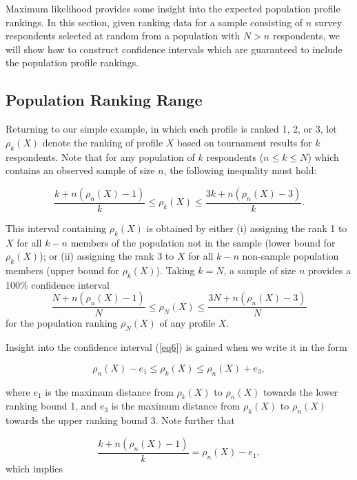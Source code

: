 \documentclass[a4paper, 12pt]{article}
\begin{document}
Maximum likelihood  provides some insight into the expected population profile rankings. In this section, given ranking data for a sample consisting of $n$ survey respondents selected at random from a population with $N> n$ respondents, we will show how to construct confidence  intervals   which are guaranteed to include the population profile rankings.

\subsection{Population Ranking Range}

Returning to our simple example, in which each profile is ranked 1, 2, or 3, let $\rho_k(X)$ denote the ranking of profile $X$ based on tournament results for $k$ respondents. Note that for any population of $k$ respondents ($n\le k \le N$) which contains an observed sample of size $n$, the following inequality must hold:

\begin{equation}
\frac{k+n(\rho_n(X)-1)}{k}\le \rho_k(X)  \le \frac{3k+n(\rho_n(X)-3)}{k}.
\label{eq6}
\end{equation}

{\flushleft This} interval containing $\rho_k(X) $ is obtained by either (i) assigning the  rank 1 to $X$ for all $k-n$ members of the population not in the sample (lower bound for $\rho_k(X)$); or (ii) assigning the rank 3 to $X$  for all $k-n$ non-sample population members (upper bound for $\rho_k(X)$). Taking $k=N$, a sample of size $n$ provides  a 100\% confidence interval $$\frac{N+n(\rho_n(X)-1)}{N}\le \rho_N(X)  \le \frac{3N+n(\rho_n(X)-3)}{N}$$ for the population ranking $\rho_N(X)$ of any profile $X$.

Insight into the confidence interval (\ref{eq6}) is gained when we write it in the form

\begin{equation}
\rho_n(X)-e_1 \le \rho_k(X) \le \rho_n(X)+e_3,
\end{equation}
\label{eq:9}

{\flushleft where} $e_1$ is the maximum distance from $\rho_k(X)$ to $\rho_n(X)$ towards the lower ranking bound 1, and $e_3$ is the maximum distance  from $\rho_k(X)$ to $\rho_n(X)$ towards the upper ranking bound 3. Note further that


\begin{equation}
\frac{k+n(\rho_n(X)-1)}{k} = \rho_n(X)-e_1,
\end{equation}
\label{eq:10}
{\flushleft which implies}
\end{document}
